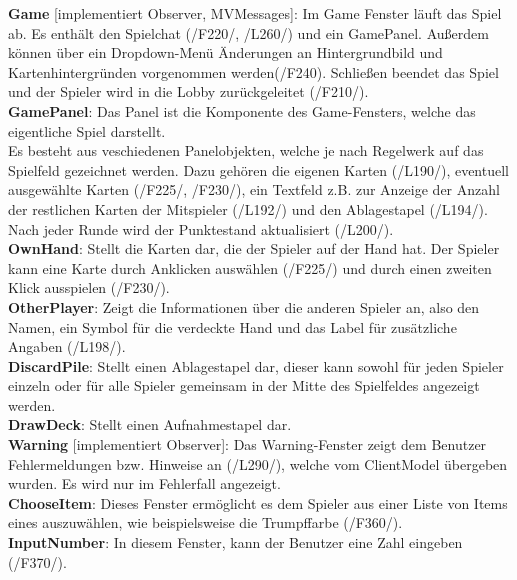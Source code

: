 \documentclass{article}
\begin{document}
\textbf{Game} [implementiert Observer, MVMessages]: Im Game Fenster läuft das Spiel ab.
Es enthält den Spielchat (/F220/, /L260/) und ein GamePanel. Außerdem können über ein Dropdown-Menü Änderungen an Hintergrundbild und Kartenhintergründen vorgenommen werden(/F240).
Schließen beendet das Spiel und der Spieler wird in die Lobby zurückgeleitet (/F210/).\\

\textbf{GamePanel}: Das Panel ist die Komponente des Game-Fensters, welche das eigentliche Spiel darstellt.\\
Es besteht aus veschiedenen Panelobjekten, welche je nach Regelwerk auf das Spielfeld gezeichnet werden.
Dazu gehören die eigenen Karten (/L190/), eventuell ausgewählte Karten (/F225/, /F230/), ein Textfeld z.B. zur Anzeige der Anzahl der restlichen Karten der Mitspieler (/L192/) und den Ablagestapel (/L194/). Nach jeder Runde wird der Punktestand  aktualisiert (/L200/). \\

\textbf{OwnHand}: Stellt die Karten dar, die der Spieler auf der Hand hat. Der Spieler kann eine Karte durch Anklicken auswählen (/F225/) und durch einen zweiten Klick ausspielen (/F230/).\\

\textbf{OtherPlayer}: Zeigt die Informationen über die anderen Spieler an, also den Namen, ein Symbol für die verdeckte Hand und das Label für zusätzliche Angaben (/L198/). \\

\textbf{DiscardPile}: Stellt einen Ablagestapel dar, dieser kann sowohl für jeden Spieler einzeln oder für alle Spieler gemeinsam in der Mitte des Spielfeldes angezeigt werden.\\

\textbf{DrawDeck}: Stellt einen Aufnahmestapel dar. \\

\textbf{Warning} [implementiert Observer]: Das Warning-Fenster zeigt dem Benutzer Fehlermeldungen bzw. Hinweise an (/L290/), welche vom ClientModel übergeben wurden. Es wird nur im Fehlerfall angezeigt. \\

\textbf{ChooseItem}: Dieses Fenster ermöglicht es dem Spieler aus einer Liste von Items eines auszuwählen, wie beispielsweise die Trumpffarbe (/F360/). \\

\textbf{InputNumber}: In diesem Fenster, kann der Benutzer eine Zahl eingeben (/F370/). \\
\end{document}
